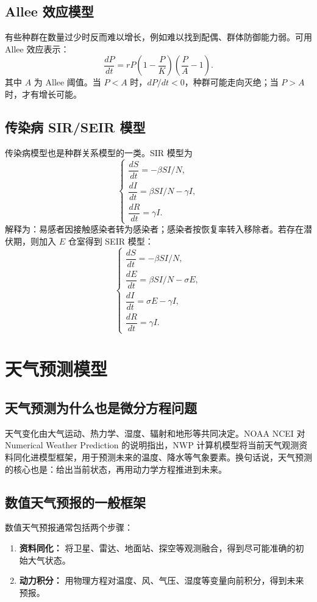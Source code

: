 \documentclass[11pt,a4paper]{ctexart}
\begin{document}
\subsection{Allee 效应模型}
有些种群在数量过少时反而难以增长，例如难以找到配偶、群体防御能力弱。可用 Allee 效应表示：
\[
\frac{dP}{dt}=rP\left(1-\frac{P}{K}\right)\left(\frac{P}{A}-1\right).
\]
其中 $A$ 为 Allee 阈值。当 $P<A$ 时，$dP/dt<0$，种群可能走向灭绝；当 $P>A$ 时，才有增长可能。

\subsection{传染病 SIR/SEIR 模型}
传染病模型也是种群关系模型的一类。SIR 模型为
\[
\begin{cases}
\dfrac{dS}{dt}=-\beta SI/N,\\[0.4em]
\dfrac{dI}{dt}=\beta SI/N-\gamma I,\\[0.4em]
\dfrac{dR}{dt}=\gamma I.
\end{cases}
\]
解释为：易感者因接触感染者转为感染者；感染者按恢复率转入移除者。若存在潜伏期，则加入 $E$ 仓室得到 SEIR 模型：
\[
\begin{cases}
\dfrac{dS}{dt}=-\beta SI/N,\\
\dfrac{dE}{dt}=\beta SI/N-\sigma E,\\
\dfrac{dI}{dt}=\sigma E-\gamma I,\\
\dfrac{dR}{dt}=\gamma I.
\end{cases}
\]

\section{天气预测模型}

\subsection{天气预测为什么也是微分方程问题}
天气变化由大气运动、热力学、湿度、辐射和地形等共同决定。NOAA NCEI 对 Numerical Weather Prediction 的说明指出，NWP 计算机模型将当前天气观测资料同化进模型框架，用于预测未来的温度、降水等气象要素。换句话说，天气预测的核心也是：给出当前状态，再用动力学方程推进到未来。

\subsection{数值天气预报的一般框架}
数值天气预报通常包括两个步骤：
\begin{enumerate}[itemsep=0.2em]
\item \textbf{资料同化：} 将卫星、雷达、地面站、探空等观测融合，得到尽可能准确的初始大气状态。
\item \textbf{动力积分：} 用物理方程对温度、风、气压、湿度等变量向前积分，得到未来预报。
\end{enumerate}
\end{document}
